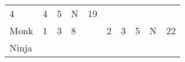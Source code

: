 \documentclass[12pt]{article}
\newcommand{\indexClass}[1]{\index{#1}}
\newcommand{\class}[1]{#1\indexClass{#1}}
\begin{document}
\begin{longtable}[]{@{}llllllllll@{}}
\begin{minipage}[t]{0.06\columnwidth}\raggedright\strut
4
\strut\end{minipage} &
\begin{minipage}[t]{0.06\columnwidth}\raggedright\strut
4
\strut\end{minipage} &
\begin{minipage}[t]{0.06\columnwidth}\raggedright\strut
5
\strut\end{minipage} &
\begin{minipage}[t]{0.07\columnwidth}\raggedright\strut
N
\strut\end{minipage} &
\begin{minipage}[t]{0.08\columnwidth}\raggedright\strut
19
\strut\end{minipage}\tabularnewline
\begin{minipage}[t]{0.13\columnwidth}\raggedright\strut
\class{Monk}
\strut\end{minipage} &
\begin{minipage}[t]{0.06\columnwidth}\raggedright\strut
1
\strut\end{minipage} &
\begin{minipage}[t]{0.06\columnwidth}\raggedright\strut
3
\strut\end{minipage} &
\begin{minipage}[t]{0.06\columnwidth}\raggedright\strut
8
\strut\end{minipage} &
\begin{minipage}[t]{0.06\columnwidth}\raggedright\strut
\strut\end{minipage} &
\begin{minipage}[t]{0.06\columnwidth}\raggedright\strut
2
\strut\end{minipage} &
\begin{minipage}[t]{0.06\columnwidth}\raggedright\strut
3
\strut\end{minipage} &
\begin{minipage}[t]{0.06\columnwidth}\raggedright\strut
5
\strut\end{minipage} &
\begin{minipage}[t]{0.07\columnwidth}\raggedright\strut
N
\strut\end{minipage} &
\begin{minipage}[t]{0.08\columnwidth}\raggedright\strut
22
\strut\end{minipage}\tabularnewline
\begin{minipage}[t]{0.13\columnwidth}\raggedright\strut
\class{Ninja}
\strut\end{minipage} &

\end{longtable}
\end{document}
